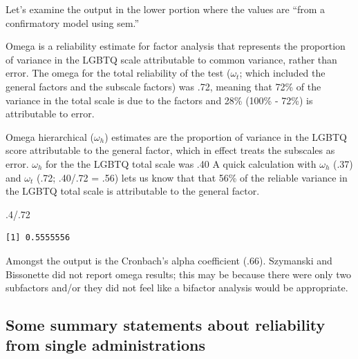 \documentclass[
  english,
]{book}
\newenvironment{Shaded}{\begin{snugshade}}{\end{snugshade}}
\newcommand{\DecValTok}[1]{\textcolor[rgb]{0.00,0.00,0.81}{#1}}
\newcommand{\NormalTok}[1]{#1}
\newcommand{\SpecialCharTok}[1]{\textcolor[rgb]{0.00,0.00,0.00}{#1}}
\begin{document}
Let's examine the output in the lower portion where the values are ``from a confirmatory model using sem.''

Omega is a reliability estimate for factor analysis that represents the proportion of variance in the LGBTQ scale attributable to common variance, rather than error. The omega for the total reliability of the test (\(\omega_{t}\); which included the general factors and the subscale factors) was .72, meaning that 72\% of the variance in the total scale is due to the factors and 28\% (100\% - 72\%) is attributable to error.

Omega hierarchical (\(\omega_{h}\)) estimates are the proportion of variance in the LGBTQ score attributable to the general factor, which in effect treats the subscales as error. \(\omega_{h}\) for the the LGBTQ total scale was .40 A quick calculation with \(\omega_{h}\) (.37) and \(\omega_{t}\) (.72; .40/.72 = .56) lets us know that that 56\% of the reliable variance in the LGBTQ total scale is attributable to the general factor.

\begin{Shaded}
\begin{Highlighting}[]
\NormalTok{.}\DecValTok{4}\SpecialCharTok{/}\NormalTok{.}\DecValTok{72}
\end{Highlighting}
\end{Shaded}

\begin{verbatim}
[1] 0.5555556
\end{verbatim}

Amongst the output is the Cronbach's alpha coefficient (.66). Szymanski and Bissonette \citep{szymanski_perceptions_2020} did not report omega results; this may be because there were only two subfactors and/or they did not feel like a bifactor analysis would be appropriate.

\hypertarget{some-summary-statements-about-reliability-from-single-administrations}{%
\subsection{Some summary statements about reliability from single administrations}\label{some-summary-statements-about-reliability-from-single-administrations}}
\end{document}
